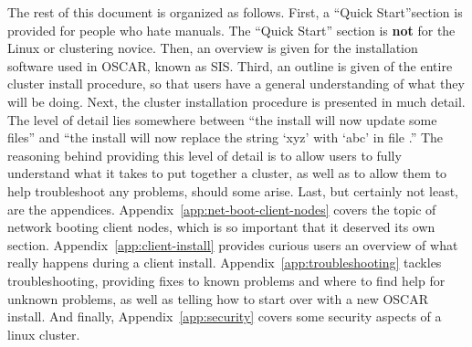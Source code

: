 The rest of this document is organized as follows.  \begchange First,
a ``Quick Start''section is provided for people who hate manuals.  The
``Quick Start'' section is {\bf not} for the Linux or clustering
novice. Then, an overview is given for the installation software used
in OSCAR, known as SIS.
%
\begchange
%
Third, 
%
\endchange
%
an outline is given of the entire cluster install procedure, so that
users have a general understanding of what they will be doing.  Next,
the cluster installation procedure is presented in much detail.  The
level of detail lies somewhere between ``the install will now update
some files'' and ``the install will now replace the string `xyz' with
`abc' in file .'' The reasoning behind providing this
level of detail is to allow users to fully understand what it takes to
put together a cluster, as well as to allow them to help troubleshoot
any problems, should some arise. Last, but certainly not least, are
the appendices.  Appendix~\ref{app:net-boot-client-nodes} covers the
topic of network booting client nodes, which is so important that it
deserved its own section.  
Appendix~\ref{app:client-install} provides curious users an overview
of what really happens during a client install.
%
\begchange
%
Appendix~\ref{app:troubleshooting} tackles troubleshooting, providing
fixes to known problems and where to find help for unknown problems,
as well as telling how to start over with a new OSCAR install.  And
finally, Appendix~\ref{app:security} covers some security aspects of a
linux cluster.
%
\endchange
